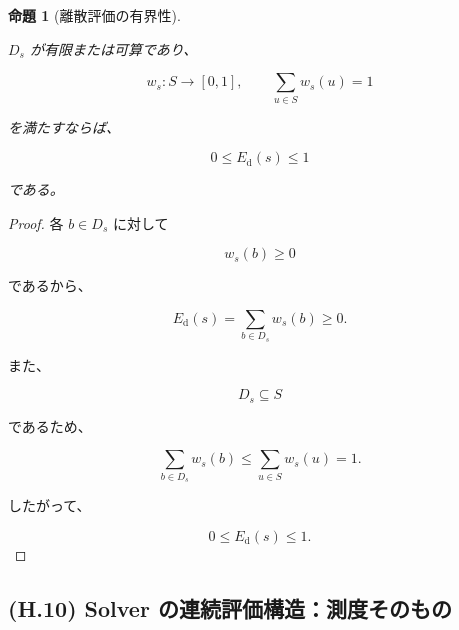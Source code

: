 \documentclass[a4paper,11pt]{article}
\newtheorem{proposition}[definition]{命題}
\begin{document}
\begin{proposition}[離散評価の有界性]
\label{prop:H-discrete-bound}

$D_s$ が有限または可算であり、

\begin{equation}
    w_s:S\to[0,1],
    \qquad
    \sum_{u\in S}w_s(u)=1
\end{equation}

を満たすならば、

\begin{equation}
    \boxed{
        0
        \leq
        E_{\mathrm d}(s)
        \leq
        1
    }
    \label{eq:H-discrete-bound}
\end{equation}

である。
\end{proposition}

\begin{proof}

各 $b\in D_s$ に対して

\begin{equation}
    w_s(b)\geq0
\end{equation}

であるから、

\begin{equation}
    E_{\mathrm d}(s)
    =
    \sum_{b\in D_s}w_s(b)
    \geq0.
\end{equation}

また、

\begin{equation}
    D_s\subseteq S
\end{equation}

であるため、

\begin{equation}
    \sum_{b\in D_s}w_s(b)
    \leq
    \sum_{u\in S}w_s(u)
    =
    1.
\end{equation}

したがって、

\begin{equation}
    0\leq E_{\mathrm d}(s)\leq1.
\end{equation}

\end{proof}


\subsection{(H.10) Solver の連続評価構造：測度そのもの}
\label{subsec:H10}
\end{document}
